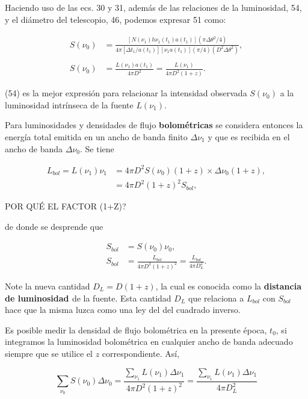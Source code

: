 \documentclass{article}
\begin{document}
    Haciendo uso de las ecs. 30 y 31, además de las relaciones de la luminosidad, 54, y el diámetro del telescopio, 46, podemos expresar 51 como: 
    
    \begin{align}
        S( \nu_0) & = \frac{[N(\nu_1) h \nu_1 (t_1) a(t_1)] (\pi \Delta \theta^2/4)}{4 \pi [\Delta t_1/a(t_1)] [\nu_1 a(t_1)] (\pi/4)(D^2 \Delta \theta^2)}, \\ 
        \\
        S(\nu_0) & = \frac{L(\nu_1) a(t_1)}{4\pi D^2} =\frac{L(\nu_1)}{4\pi D^2(1+z)}.
    \end{align}

    (54) es la mejor expresión para relacionar la intensidad observada $S(\nu_0)$ a la luminosidad intrínseca de la fuente $L(\nu_1)$. 
    
    Para luminosidades y densidades de flujo {\bf{bolométricas}} se considera entonces la energía total emitida en un ancho de banda finito $\Delta \nu_1$ y que es recibida en el ancho de banda $\Delta \nu_0$. Se tiene
    
    \begin{align}
        L_{bol}= L (\nu_1) \nu_1 & = 4 \pi D^2 S(\nu_0)(1+z) \times \Delta \nu_0 (1+z), \\
        & = 4 \pi D^2 (1+z)^2 S_{bol},
    \end{align}

    POR QUÉ EL FACTOR (1+Z)? 

    de donde se desprende que 
    
    \begin{align}
        S_{bol} & = S(\nu_0) \nu_0, \\
        S_{bol}  & = \frac{L_{bol}}{4 \pi D^2 (1+z)^2} =  \frac{L_{bol}}{4 \pi D_L^2}.
    \end{align}
    
    Note la nueva cantidad $D_L =  D (1+z) $, la cual es conocida como la {\bf{distancia de luminosidad }} de la fuente. Esta cantidad $D_L$ que relaciona a $L_{bol}$ con $S_{bol}$ hace que la misma luzca como una ley del  del cuadrado inverso. 
    
    Es posible medir la densidad de flujo bolométrica en la presente época, $t_0$, si integramos la luminosidad bolométrica en cualquier ancho de banda adecuado siempre que se utilice el $z$  correspondiente. Así, 
    
    \begin{equation}
        \sum_{\nu_0} S(\nu_0) \Delta \nu_0 = \frac{ \sum_{\nu_1} L(\nu_1) \Delta \nu_1 }{4 \pi D^2 (1+z)^2} =   \frac{\sum_{\nu_1} L(\nu_1) \Delta \nu_1}{4 \pi D_L^2}
    \end{equation}
    
\end{document}
